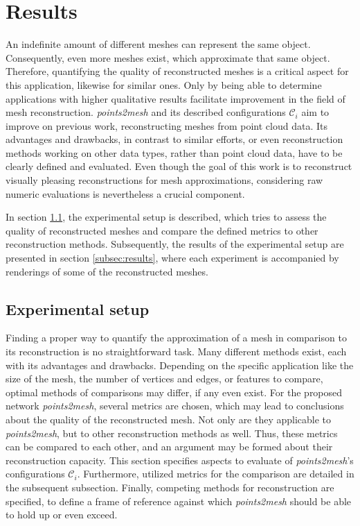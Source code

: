 \chapter{Results}
\label{sec:results}

    An indefinite amount of different meshes can represent the same object.
    Consequently, even more meshes exist, which approximate that same object. 
    Therefore, quantifying the quality of reconstructed meshes is a critical aspect for 
    this application, likewise for similar ones. Only by being able to determine applications
    with higher qualitative results facilitate improvement in the field of mesh 
    reconstruction. 
    \emph{points2mesh} and its described configurations $\mathcal{C}_i$ aim to improve on previous work,
    reconstructing meshes from point cloud data. Its advantages and drawbacks, in contrast to similar efforts, 
    or even reconstruction methods working on other data types, rather than point cloud data, have to be clearly
    defined and evaluated.
    Even though the goal of this work is to reconstruct visually pleasing reconstructions for mesh approximations, 
    considering raw numeric evaluations is nevertheless a crucial component.

    In section \ref{subsec:exp}, the experimental setup is described, which tries to assess
    the quality of reconstructed meshes and compare the defined metrics to other reconstruction methods. 
    Subsequently, the results of the experimental setup are presented in section \ref{subsec:results}, where
    each experiment is accompanied by renderings of some of the reconstructed meshes.


\section{Experimental setup}
\label{subsec:exp}

    Finding a proper way to quantify the approximation of a mesh in comparison to its reconstruction is no straightforward task.
    Many different methods exist, each with its advantages and drawbacks. Depending on the specific application like the size of
    the mesh, the number of vertices and edges, or features to compare, optimal methods of comparisons may differ, if any even
    exist. For the proposed network \emph{points2mesh}, several metrics are chosen, which may lead to conclusions about the quality 
    of the reconstructed mesh. Not only are they applicable to \emph{points2mesh}, but to other reconstruction methods as well. 
    Thus, these metrics can be compared to each other, and an argument may be formed about their reconstruction capacity. This 
    section specifies aspects to evaluate of \emph{points2mesh}'s configurations $\mathcal{C}_i$. Furthermore, utilized metrics 
    for the comparison are detailed in the subsequent subsection. Finally, competing methods for reconstruction are specified,
    to define a frame of reference against which \emph{points2mesh} should be able to hold up or even exceed.


